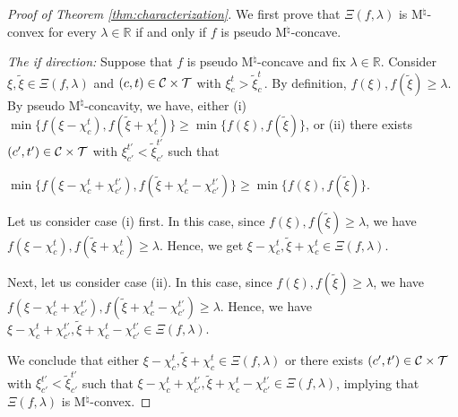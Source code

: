 \documentclass[12pt]{amsart}
\theoremstyle{remark}
\begin{document}
\begin{proof}[Proof of Theorem \ref{thm:characterization}]

We first prove that $\Xi(f,\lambda)$ is M$^{\natural}$-convex for every $\lambda\in \mathbb{R}$ if and only if $f$ is pseudo M$^{\natural}$-concave.
\medskip

\noindent
\emph{The if direction:} Suppose that $f$ is pseudo M$^{\natural}$-concave and fix $\lambda\in \mathbb{R}$. Consider $\xi, \tilde{\xi} \in \Xi(f,\lambda)$ and $(c,t)\in \mathcal{C} \times \mathcal{T}$ with $\xi_c^t>\tilde{\xi}_c^t \,$.
By definition, $f(\xi),f(\tilde{\xi}) \geq \lambda$.
By pseudo M$^{\natural}$-concavity, we have, either (i) $\min \{f(\xi-\chi_c^t), f(\tilde{\xi}+\chi_c^t)\} \geq \min \{f(\xi),f(\tilde{\xi})\}$, or
(ii) there exists $(c',t')\in \mathcal{C} \times \mathcal{T}$ with $\xi_{c'}^{t'}<\tilde{\xi}_{c'}^{t'}$ such that
  \begin{center}
  $\min \{f(\xi-\chi_c^t+\chi_{c'}^{t'}), f(\tilde{\xi}+\chi_c^t-\chi_{c'}^{t'})\} \geq \min \{f(\xi),f(\tilde{\xi})\}$.
  \end{center}

Let us consider case (i) first. In this case, since $f(\xi),f(\tilde{\xi}) \geq \lambda$, we have $f(\xi-\chi_c^t), f(\tilde{\xi}+\chi_c^t)  \geq \lambda$. Hence, we get
$\xi-\chi_c^t, \tilde{\xi}+\chi_c^t \in \Xi(f,\lambda)$.

Next, let us consider case (ii). In this case, since $f(\xi),f(\tilde{\xi}) \geq \lambda$, we have $f(\xi-\chi_c^t+\chi_{c'}^{t'}),f(\tilde{\xi}+\chi_c^t-\chi_{c'}^{t'}) \geq \lambda$. Hence, we have $\xi-\chi_c^t+\chi_{c'}^{t'},\tilde{\xi}+\chi_c^t-\chi_{c'}^{t'}\in \Xi(f,\lambda)$.

We conclude that either $\xi-\chi_c^t, \tilde{\xi}+\chi_c^t \in \Xi(f,\lambda)$ or there exists $(c',t')\in \mathcal{C} \times \mathcal{T}$ with $\xi_{c'}^{t'}<\tilde{\xi}_{c'}^{t'}$
such that $\xi-\chi_c^t+\chi_{c'}^{t'},\tilde{\xi}+\chi_c^t-\chi_{c'}^{t'}\in \Xi(f,\lambda)$, implying that $\Xi(f,\lambda)$ is M$^{\natural}$-convex.



\end{proof}
\end{document}
